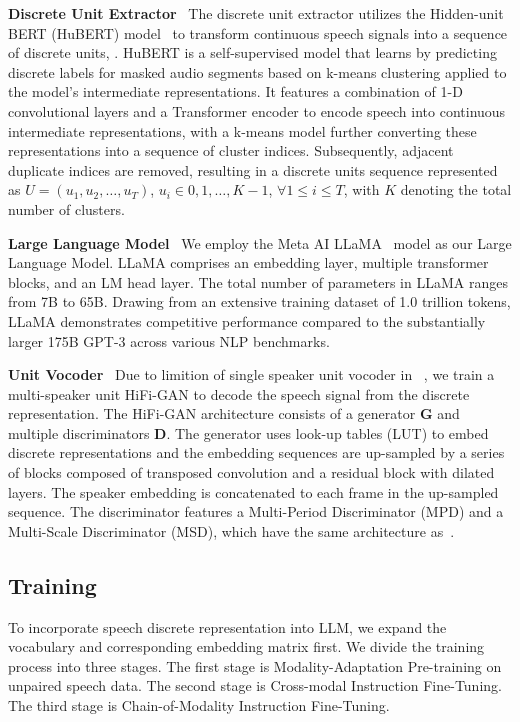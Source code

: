 \noindent\textbf{Discrete Unit Extractor}~
The discrete unit extractor utilizes the Hidden-unit BERT (HuBERT) model~\citep{hsu2021hubert} to transform continuous speech signals into a sequence of discrete units, . HuBERT is a self-supervised model that learns by predicting discrete labels for masked audio segments based on k-means clustering applied to the model's intermediate representations. It features a combination of 1-D convolutional layers and a Transformer encoder to encode speech into continuous intermediate representations, with a k-means model further converting these representations into a sequence of cluster indices. Subsequently, adjacent duplicate indices are removed, resulting in a discrete units sequence represented as $U=(u_1, u_2, \ldots, u_T)$, $u_i \in {0,1, \ldots, K-1}$, $\forall 1 \leq i \leq T$, with $K$ denoting the total number of clusters.

\noindent\textbf{Large Language Model}~
We employ the Meta AI LLaMA~\citep{touvron2023llama} model as our Large Language Model. LLaMA comprises an embedding layer, multiple transformer blocks, and an LM head layer. The total number of parameters in LLaMA ranges from 7B to 65B. Drawing from an extensive training dataset of 1.0 trillion tokens, LLaMA demonstrates competitive performance compared to the substantially larger 175B GPT-3 across various NLP benchmarks. 

\noindent\textbf{Unit Vocoder}~
Due to limition of single speaker unit vocoder in ~\citep{polyak2021speech}, we train a multi-speaker unit HiFi-GAN to decode the speech signal from
the discrete representation.
The HiFi-GAN architecture consists of a generator $\mathbf{G}$ and multiple discriminators $\mathbf{D}$. The generator uses look-up tables (LUT) to embed discrete representations and the embedding sequences are up-sampled by a series of blocks composed of transposed convolution and a residual block with dilated layers. 
The speaker embedding is concatenated to each frame in the up-sampled sequence.
The discriminator features a Multi-Period Discriminator (MPD) and a Multi-Scale Discriminator (MSD), which have the same architecture as~\citep{polyak2021speech}.

\subsection{Training}
\label{sec:032_training}

To incorporate speech discrete representation into LLM, we expand the vocabulary and corresponding embedding matrix first. We divide the training process into three stages. The first stage is Modality-Adaptation Pre-training on unpaired speech data. The second stage is Cross-modal Instruction Fine-Tuning. The third stage is Chain-of-Modality Instruction Fine-Tuning.

